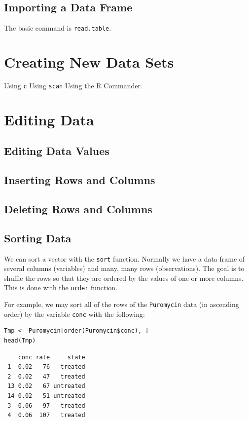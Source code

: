 \documentclass[captions=tableheading]{scrbook}
\begin{document}
\subsection{Importing a Data Frame}
\label{sec-20-2-4}


The basic command is \texttt{read.table}.
\section{Creating New Data Sets \label{sec:Creating-New-Data}}
\label{sec-20-3}

Using \texttt{c}
Using \texttt{scan}
Using the \textsf{R} Commander.
\section{Editing Data \label{sec:Editing-Data-Sets}}
\label{sec-20-4}
\subsection{Editing Data Values}
\label{sec-20-4-1}
\subsection{Inserting Rows and Columns}
\label{sec-20-4-2}
\subsection{Deleting Rows and Columns}
\label{sec-20-4-3}
\subsection{Sorting Data}
\label{sec-20-4-4}


We can sort a vector with the \texttt{sort} function. Normally we have a data frame of several columns (variables) and many, many rows (observations). The goal is to shuffle the rows so that they are ordered by the values of one or more columns. This is done with the \texttt{order} function. 

For example, we may sort all of the rows of the \texttt{Puromycin} data (in ascending order) by the variable \texttt{conc} with the following: 


\begin{verbatim}
Tmp <- Puromycin[order(Puromycin$conc), ]
head(Tmp)
\end{verbatim}

\begin{verbatim}
    conc rate     state
 1  0.02   76   treated
 2  0.02   47   treated
 13 0.02   67 untreated
 14 0.02   51 untreated
 3  0.06   97   treated
 4  0.06  107   treated
\end{verbatim}
\end{document}
